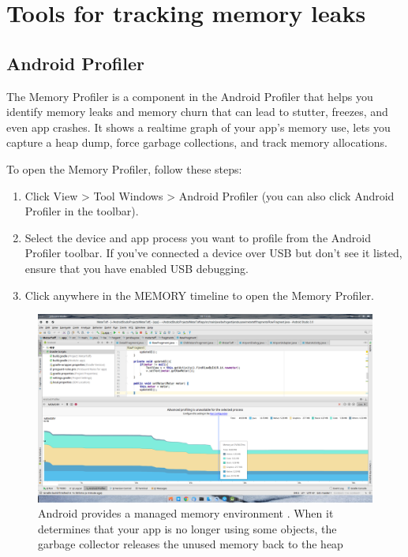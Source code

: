 \section{Tools for tracking memory leaks}
\subsection{Android Profiler}
The Memory Profiler is a component in the Android Profiler that helps you identify memory leaks and memory churn that can lead to stutter, freezes, and even app crashes. It shows a realtime graph of your app's memory use, lets you capture a heap dump, force garbage collections, and track memory allocations.

To open the Memory Profiler, follow these steps:

\begin{enumerate}
	\item Click View > Tool Windows > Android Profiler (you can also click Android Profiler  in the toolbar).
	\item Select the device and app process you want to profile from the Android Profiler toolbar. If you've connected a device over USB but don't see it listed, ensure that you have enabled USB debugging.
	\item Click anywhere in the MEMORY timeline to open the Memory Profiler.
\end{enumerate}

\begin{figure}[h]
	\includegraphics[width=\textwidth]{images/memory/profiler.png}
	\caption{Android provides a managed memory environment . When it determines that your app is no longer using some objects, the garbage collector releases the unused memory back to the heap}
	\label{fig:profiler}
\end{figure}

